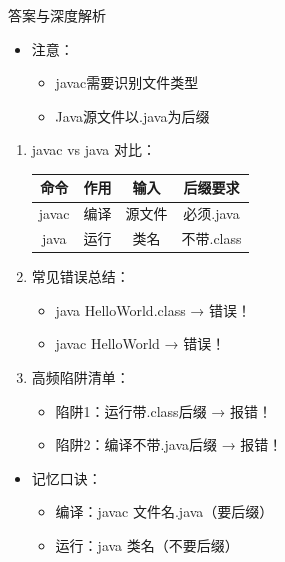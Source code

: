 \documentclass[12pt, a4paper]{ctexart}
\begin{document}
\begin{enumerate}[label=\textbf{\arabic*.}]
\begin{bluebox}{答案与深度解析}
\begin{itemize}[leftmargin=*, nosep]
			      \item 注意：
			            \begin{itemize}
				            \item javac需要识别文件类型
				            \item Java源文件以.java为后缀
			            \end{itemize}
		      \end{itemize}

		      \begin{enumerate}[leftmargin=*, nosep]
			      \item javac vs java 对比：
			            \begin{tabular}{|c|c|c|c|}
				            \hline
				            \textbf{命令} & \textbf{作用} & \textbf{输入} & \textbf{后缀要求} \\
				            \hline
				            javac       & 编译          & 源文件         & 必须.java       \\
				            \hline
				            java        & 运行          & 类名          & 不带.class      \\
				            \hline
			            \end{tabular}

			      \item 常见错误总结：
			            \begin{itemize}
				            \item java HelloWorld.class → 错误！
				            \item javac HelloWorld → 错误！
			            \end{itemize}

			      \item 高频陷阱清单：
			            \begin{itemize}
				            \item 陷阱1：运行带.class后缀 → 报错！
				            \item 陷阱2：编译不带.java后缀 → 报错！
			            \end{itemize}
		      \end{enumerate}

		      \begin{itemize}[leftmargin=*, nosep]
			      \item 记忆口诀：
			            \begin{itemize}
				            \item 编译：javac 文件名.java（要后缀）
				            \item 运行：java 类名（不要后缀）
			            \end{itemize}


\end{itemize}
\end{bluebox}
\end{enumerate}
\end{document}
